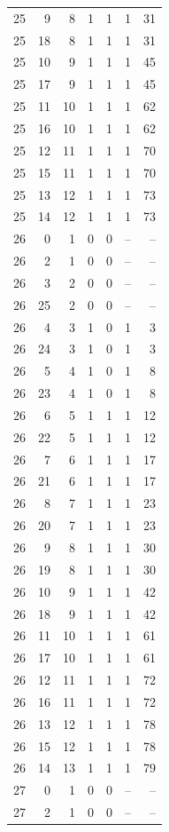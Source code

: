 \begin{longtable}{rrrrrrr}
25 & 9 & 8 & 1 & 1 & 1 & 31\\
25 & 18 & 8 & 1 & 1 & 1 & 31\\
25 & 10 & 9 & 1 & 1 & 1 & 45\\
25 & 17 & 9 & 1 & 1 & 1 & 45\\
25 & 11 & 10 & 1 & 1 & 1 & 62\\
25 & 16 & 10 & 1 & 1 & 1 & 62\\
25 & 12 & 11 & 1 & 1 & 1 & 70\\
25 & 15 & 11 & 1 & 1 & 1 & 70\\
25 & 13 & 12 & 1 & 1 & 1 & 73\\
25 & 14 & 12 & 1 & 1 & 1 & 73\\
26 & 0 & 1 & 0 & 0 & -- & --\\
26 & 2 & 1 & 0 & 0 & -- & --\\
26 & 3 & 2 & 0 & 0 & -- & --\\
26 & 25 & 2 & 0 & 0 & -- & --\\
26 & 4 & 3 & 1 & 0 & 1 & 3\\
26 & 24 & 3 & 1 & 0 & 1 & 3\\
26 & 5 & 4 & 1 & 0 & 1 & 8\\
26 & 23 & 4 & 1 & 0 & 1 & 8\\
26 & 6 & 5 & 1 & 1 & 1 & 12\\
26 & 22 & 5 & 1 & 1 & 1 & 12\\
26 & 7 & 6 & 1 & 1 & 1 & 17\\
26 & 21 & 6 & 1 & 1 & 1 & 17\\
26 & 8 & 7 & 1 & 1 & 1 & 23\\
26 & 20 & 7 & 1 & 1 & 1 & 23\\
26 & 9 & 8 & 1 & 1 & 1 & 30\\
26 & 19 & 8 & 1 & 1 & 1 & 30\\
26 & 10 & 9 & 1 & 1 & 1 & 42\\
26 & 18 & 9 & 1 & 1 & 1 & 42\\
26 & 11 & 10 & 1 & 1 & 1 & 61\\
26 & 17 & 10 & 1 & 1 & 1 & 61\\
26 & 12 & 11 & 1 & 1 & 1 & 72\\
26 & 16 & 11 & 1 & 1 & 1 & 72\\
26 & 13 & 12 & 1 & 1 & 1 & 78\\
26 & 15 & 12 & 1 & 1 & 1 & 78\\
26 & 14 & 13 & 1 & 1 & 1 & 79\\
27 & 0 & 1 & 0 & 0 & -- & --\\
27 & 2 & 1 & 0 & 0 & -- & --\\

\end{longtable}
